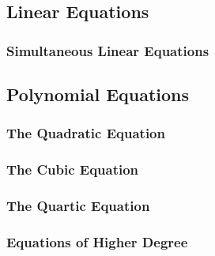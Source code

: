 \subsection{Linear Equations}


\subsubsection{Simultaneous Linear Equations}






\subsection{Polynomial Equations}

\subsubsection{The Quadratic Equation}

\subsubsection{The Cubic Equation}

\subsubsection{The Quartic Equation}


\subsubsection{Equations of Higher Degree}

